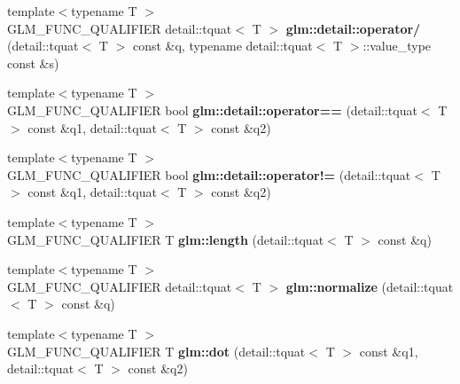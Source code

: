 \begin{DoxyCompactItemize}
\item 
\hypertarget{namespaceglm_1_1detail_a47775e56016984a714086b0d4e1dc673}{{\footnotesize template$<$typename T $>$ }\\\-G\-L\-M\-\_\-\-F\-U\-N\-C\-\_\-\-Q\-U\-A\-L\-I\-F\-I\-E\-R \*
detail\-::tquat$<$ \-T $>$ {\bfseries glm\-::detail\-::operator/} (detail\-::tquat$<$ \-T $>$ const \&q, typename detail\-::tquat$<$ \-T $>$\-::value\-\_\-type const \&s)}\label{namespaceglm_1_1detail_a47775e56016984a714086b0d4e1dc673}

\item 
\hypertarget{namespaceglm_1_1detail_a96329fbb8f896966d3c4d389ae2c9716}{{\footnotesize template$<$typename T $>$ }\\\-G\-L\-M\-\_\-\-F\-U\-N\-C\-\_\-\-Q\-U\-A\-L\-I\-F\-I\-E\-R bool {\bfseries glm\-::detail\-::operator==} (detail\-::tquat$<$ \-T $>$ const \&q1, detail\-::tquat$<$ \-T $>$ const \&q2)}\label{namespaceglm_1_1detail_a96329fbb8f896966d3c4d389ae2c9716}

\item 
\hypertarget{namespaceglm_1_1detail_aa7964957d37518ed89c2d08e2b33cd79}{{\footnotesize template$<$typename T $>$ }\\\-G\-L\-M\-\_\-\-F\-U\-N\-C\-\_\-\-Q\-U\-A\-L\-I\-F\-I\-E\-R bool {\bfseries glm\-::detail\-::operator!=} (detail\-::tquat$<$ \-T $>$ const \&q1, detail\-::tquat$<$ \-T $>$ const \&q2)}\label{namespaceglm_1_1detail_aa7964957d37518ed89c2d08e2b33cd79}

\item 
\hypertarget{namespaceglm_a582c29c22038153e51d831c3759bf244}{{\footnotesize template$<$typename T $>$ }\\\-G\-L\-M\-\_\-\-F\-U\-N\-C\-\_\-\-Q\-U\-A\-L\-I\-F\-I\-E\-R \-T {\bfseries glm\-::length} (detail\-::tquat$<$ \-T $>$ const \&q)}\label{namespaceglm_a582c29c22038153e51d831c3759bf244}

\item 
\hypertarget{namespaceglm_a12af9adf93de34213747f425b1e25a45}{{\footnotesize template$<$typename T $>$ }\\\-G\-L\-M\-\_\-\-F\-U\-N\-C\-\_\-\-Q\-U\-A\-L\-I\-F\-I\-E\-R \*
detail\-::tquat$<$ \-T $>$ {\bfseries glm\-::normalize} (detail\-::tquat$<$ \-T $>$ const \&q)}\label{namespaceglm_a12af9adf93de34213747f425b1e25a45}

\item 
\hypertarget{namespaceglm_a8bd68e4adbaca14dbd02068dcf8e6c0a}{{\footnotesize template$<$typename T $>$ }\\\-G\-L\-M\-\_\-\-F\-U\-N\-C\-\_\-\-Q\-U\-A\-L\-I\-F\-I\-E\-R \-T {\bfseries glm\-::dot} (detail\-::tquat$<$ \-T $>$ const \&q1, detail\-::tquat$<$ \-T $>$ const \&q2)}\label{namespaceglm_a8bd68e4adbaca14dbd02068dcf8e6c0a}


\end{DoxyCompactItemize}
